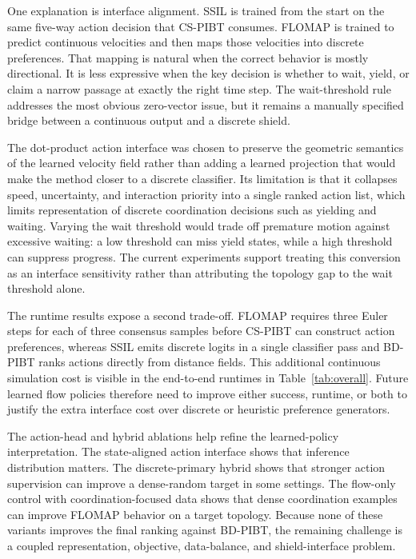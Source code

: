 \documentclass[conference]{IEEEtran}
\begin{document}
One explanation is interface alignment.  SSIL is trained from the
start on the same five-way action decision that CS-PIBT consumes.  FLOMAP
is trained to predict continuous velocities and then maps those velocities into
discrete preferences.  That mapping is natural when the correct behavior is
mostly directional.  It is less expressive when the key decision is whether to
wait, yield, or claim a narrow passage at exactly the right time step.  The
wait-threshold rule addresses the most obvious zero-vector issue, but it
remains a manually specified bridge between a continuous output and a discrete
shield.

The dot-product action interface was chosen to preserve the geometric semantics
of the learned velocity field rather than adding a learned projection that would
make the method closer to a discrete classifier.  Its limitation is that it
collapses speed, uncertainty, and interaction priority into a single ranked action
list, which limits representation of discrete coordination decisions such as
yielding and waiting.  Varying the wait threshold would trade off premature motion against
excessive waiting: a low threshold can miss yield states, while a high threshold
can suppress progress.  The current experiments support treating this
conversion as an interface sensitivity rather than attributing the topology gap
to the wait threshold alone.

The runtime results expose a second trade-off.  FLOMAP requires three Euler
steps for each of three consensus samples before CS-PIBT can construct action
preferences, whereas SSIL emits discrete logits in a single classifier pass and
BD-PIBT ranks actions directly from distance fields.  This additional continuous
simulation cost is visible in the end-to-end runtimes in
Table~\ref{tab:overall}.  Future learned
flow policies therefore need to improve either success, runtime, or both to
justify the extra interface cost over discrete or heuristic preference
generators.

The action-head and hybrid ablations help refine the learned-policy
interpretation.  The
state-aligned action interface shows that inference distribution matters.  The
discrete-primary hybrid shows that stronger action supervision can improve a
dense-random target in some settings.  The flow-only control with
coordination-focused data shows that dense coordination examples can improve
FLOMAP behavior on a target topology.  Because none of these variants
improves the final ranking against BD-PIBT, the remaining challenge
is a coupled representation, objective, data-balance, and shield-interface
problem.
\end{document}
